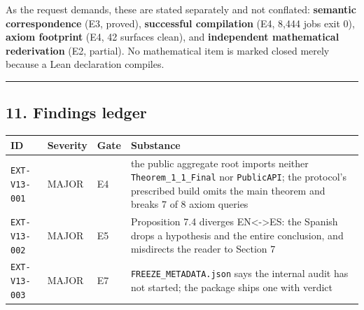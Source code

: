 \documentclass[
  10pt,
]{article}
\newcounter{none} %
\begin{document}
As the request demands, these are stated separately and not conflated:
\textbf{semantic correspondence} (E3, proved), \textbf{successful
compilation} (E4, 8,444 jobs exit 0), \textbf{axiom footprint} (E4, 42
surfaces clean), and \textbf{independent mathematical rederivation} (E2,
partial). No mathematical item is marked closed merely because a Lean
declaration compiles.

\begin{center}\rule{0.5\linewidth}{0.5pt}\end{center}

\subsection{11. Findings ledger}\label{findings-ledger}

{\def\LTcaptype{none} %
\begin{longtable}[]{@{}
  >{\raggedright\arraybackslash}p{}
  >{\raggedright\arraybackslash}p{}
  >{\raggedright\arraybackslash}p{}
  >{\raggedright\arraybackslash}p{}@{}}
\toprule\noalign{}
\begin{minipage}[b]{\linewidth}\raggedright
ID
\end{minipage} & \begin{minipage}[b]{\linewidth}\raggedright
Severity
\end{minipage} & \begin{minipage}[b]{\linewidth}\raggedright
Gate
\end{minipage} & \begin{minipage}[b]{\linewidth}\raggedright
Substance
\end{minipage} \\
\midrule\noalign{}
\endhead
\bottomrule\noalign{}
\endlastfoot
\texttt{EXT-V13-001} & MAJOR & E4 & the public aggregate root imports
neither \texttt{Theorem\_1\_1\_Final} nor \texttt{PublicAPI}; the
protocol's prescribed build omits the main theorem and breaks 7 of 8
axiom queries \\
\texttt{EXT-V13-002} & MAJOR & E5 & Proposition 7.4 diverges
EN\textless-\textgreater ES: the Spanish drops a hypothesis and the
entire conclusion, and misdirects the reader to Section 7 \\
\texttt{EXT-V13-003} & MAJOR & E7 & \texttt{FREEZE\_METADATA.json} says
the internal audit has not started; the package ships one with verdict

\end{longtable}}
\end{document}
